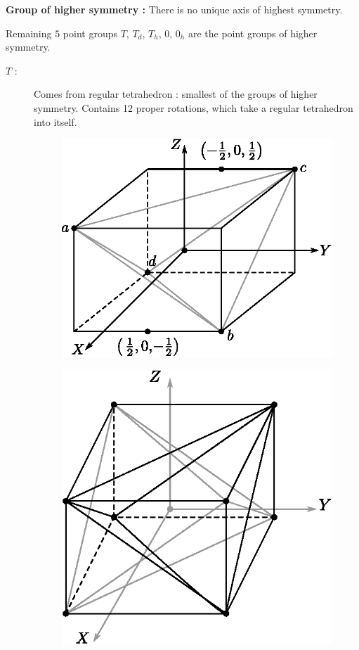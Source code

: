 \noindent
{\bf Group of higher symmetry :} There is no unique axis of highest symmetry.

Remaining $5$ point groups $T$, $T_{d}$, $T_{h}$, $0$, $0_{h}$ are the point groups of higher symmetry.
\begin{description}
\item[$T$ :] Comes from regular tetrahedron : smallest of the groups of higher symmetry. Contains 12 proper rotations, which take a regular tetrahedron into itself.
\begin{center}
\begin{minipage}[c]{6.2cm}
\begin{figure}[H]
\centering
\includegraphics[scale=.8]{images/lecture11/fig1.eps}
\end{figure}
\end{minipage}
\qquad
\begin{minipage}[c]{6.2cm}
\begin{figure}[H]
\centering
\includegraphics[scale=.8]{images/lecture11/fig2.eps}

\end{figure}
\end{minipage}
\end{center}
\end{description}
